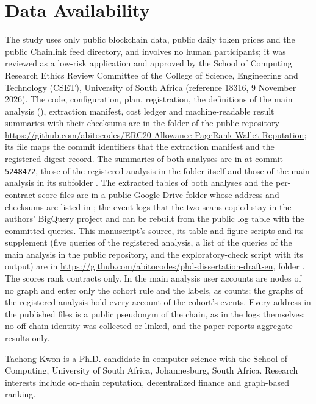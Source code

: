 \documentclass{ieeeaccess}
\newcommand{\sha}[1]{\texttt{\footnotesize #1}}
\begin{document}
\section*{Data Availability}
The study uses only public blockchain data, public daily token prices and the public Chainlink feed directory, and involves no human participants; it was reviewed as a low-risk application and approved by the School of Computing Research Ethics Review Committee of the College of Science, Engineering and Technology (CSET), University of South Africa (reference 18316, 9 November 2026). The code, configuration, plan, registration, the definitions of the main analysis (), extraction manifest, cost ledger and machine-readable result summaries with their checksums are in the folder  of the public repository \url{https://github.com/abitocodes/ERC20-Allowance-PageRank-Wallet-Reputation}; its file  maps the commit identifiers that the extraction manifest and the registered digest record. The summaries of both analyses are in  at commit \sha{5248472}, those of the registered analysis in the folder itself and those of the main analysis in its subfolder . The extracted tables of both analyses and the per-contract score files are in a public Google Drive folder whose address and checksums are listed in ; the event logs that the two scans copied stay in the authors' BigQuery project and can be rebuilt from the public log table with the committed queries. This manuscript's source, its table and figure scripts and its supplement (five queries of the registered analysis, a list of the queries of the main analysis in the public repository, and the exploratory-check script with its output) are in \url{https://github.com/abitocodes/phd-dissertation-draft-en}, folder . The scores rank contracts only. In the main analysis user accounts are nodes of no graph and enter only the cohort rule and the labels, as counts; the graphs of the registered analysis hold every account of the cohort's events. Every address in the published files is a public pseudonym of the chain, as in the logs themselves; no off-chain identity was collected or linked, and the paper reports aggregate results only.




\begin{IEEEbiographynophoto}{Taehong Kwon} is a Ph.D. candidate in computer science with the School of Computing, University of South Africa, Johannesburg, South Africa. Research interests include on-chain reputation, decentralized finance and graph-based ranking.
\end{IEEEbiographynophoto}
\end{document}
